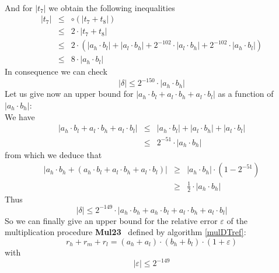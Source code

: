 \documentclass[a4paper,10pt,twoside]{article}
\newenvironment{proof}[1][Proof]{\begin{trivlist}
\item[\hskip \labelsep {\bfseries #1}]}{\end{trivlist}}
\newcommand{\hi}{\ensuremath{\mathit{h}}}
\newcommand{\mi}{\ensuremath{\mathit{m}}}
\newcommand{\lo}{\ensuremath{\mathit{l}}}
\newcommand{\MulDT}{{\bf Mul23}}
\renewcommand{\epsilon}{\varepsilon}
\begin{document}
\begin{proof}
\begin{eqnarray*}
\end{eqnarray*}
And for $\left \vert t_7 \right \vert$ we obtain the following inequalities
\begin{eqnarray*}
\left \vert t_7 \right \vert & \leq & \circ \left( \left \vert t_7 + t_8 \right \vert \right) \\
& \leq & 2 \cdot \left \vert t_7 + t_8 \right \vert \\
& \leq & 2 \cdot \left(\left \vert a_\hi \cdot b_\lo \right \vert +
                       \left \vert a_\lo \cdot b_\hi \right \vert +
                       2^{-102} \cdot \left \vert a_\lo \cdot b_\hi \right \vert +
                       2^{-102} \cdot \left \vert a_\hi \cdot b_\lo \right \vert \right) \\
& \leq & 8 \cdot \left \vert a_\hi \cdot b_\lo \right \vert
\end{eqnarray*}
In consequence we can check
$$\left \vert \delta \right \vert \leq 2^{-150} \cdot \left \vert a_\hi \cdot b_\hi \right \vert$$
Let us give now an upper bound for $\left \vert a_\hi \cdot b_\lo + a_\lo \cdot b_\hi + a_\lo \cdot b_\lo \right \vert$ as a function of
$\left \vert a_\hi \cdot b_\hi \right \vert$:\\
We have
\begin{eqnarray*}
\left \vert a_\hi \cdot b_\lo + a_\lo \cdot b_\hi + a_\lo \cdot b_\lo \right \vert & \leq &
\left \vert a_\hi \cdot b_\lo \right \vert + \left \vert a_\lo \cdot b_\hi \right \vert + \left \vert a_\lo \cdot b_\lo \right \vert \\
& \leq & 2^{-51} \cdot \left \vert a_\hi \cdot b_\hi \right \vert
\end{eqnarray*}
from which we deduce that
\begin{eqnarray*}
\left \vert a_\hi \cdot b_\hi + \left( a_\hi \cdot b_\lo + a_\lo \cdot b_\hi + a_\lo \cdot b_\lo \right) \right \vert & \geq &
\left \vert a_\hi \cdot b_\hi \right \vert \cdot \left( 1 - 2^{-51} \right) \\
& \geq & \frac{1}{2} \cdot \left \vert a_\hi \cdot b_\hi \right \vert
\end{eqnarray*}
Thus
$$\left \vert \delta \right \vert \leq
2^{-149} \cdot \left \vert a_\hi \cdot b_\hi + a_\hi \cdot b_\lo + a_\lo \cdot b_\hi + a_\lo \cdot b_\lo \right \vert$$
So we can finally give an upper bound for the relative error $\epsilon$ of the multiplication procedure \MulDT~
defined by algorithm \ref{mulDTref}:
$$r_\hi + r_\mi + r_\lo = \left( a_\hi + a_\lo \right) \cdot \left( b_\hi + b_\lo \right) \cdot \left( 1 + \epsilon \right)$$
with
$$\left \vert \epsilon \right \vert \leq 2^{-149}$$

\end{proof}
\end{document}
